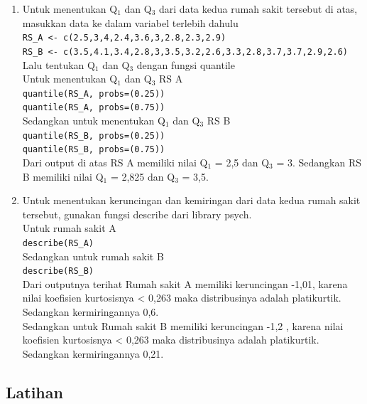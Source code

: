 \documentclass[a4paper,12pt]{article}
\begin{document}
\begin{enumerate}[label=\alph*.]
	\item Untuk menentukan Q$_{1}$ dan Q$_{3}$ dari data kedua rumah sakit tersebut di atas, masukkan data ke dalam variabel terlebih dahulu\\
	\texttt{RS\_A <- c(2.5,3,4,2.4,3.6,3,2.8,2.3,2.9)}\\
	\texttt{RS\_B <- c(3.5,4.1,3.4,2.8,3,3.5,3.2,2.6,3.3,2.8,3.7,3.7,2.9,2.6)}\\
	Lalu tentukan Q$_{1}$ dan Q$_{3}$ dengan fungsi quantile\\
	Untuk menentukan Q$_{1}$ dan Q$_{3}$ RS A\\
	\texttt{quantile(RS\_A, probs=(0.25))}\\
	\texttt{quantile(RS\_A, probs=(0.75))}\\
	Sedangkan untuk menentukan Q$_{1}$ dan Q$_{3}$ RS B\\
	\texttt{quantile(RS\_B, probs=(0.25))}\\
	\texttt{quantile(RS\_B, probs=(0.75))}\\
	Dari output di atas RS A memiliki nilai Q$_{1}$ = 2,5 dan Q$_{3}$ = 3. Sedangkan RS B memiliki nilai Q$_{1}$ = 2,825 dan Q$_{3}$ = 3,5.
	
	\item Untuk menentukan keruncingan dan kemiringan dari data kedua rumah sakit tersebut, gunakan fungsi describe dari library psych.\\
	Untuk rumah sakit A\\
	\texttt{describe(RS\_A)}\\
	Sedangkan untuk rumah sakit B\\ 
	\texttt{describe(RS\_B)}\\
	Dari outputnya terihat Rumah sakit A memiliki keruncingan -1,01, karena nilai koefisien kurtosisnya < 0,263 maka distribusinya adalah platikurtik. Sedangkan kermiringannya 0,6.\\
	Sedangkan untuk Rumah sakit B memiliki keruncingan -1,2 , karena nilai koefisien kurtosisnya < 0,263 maka distribusinya adalah platikurtik. Sedangkan kermiringannya 0,21.
\end{enumerate}

\subsection{Latihan}
\end{document}
